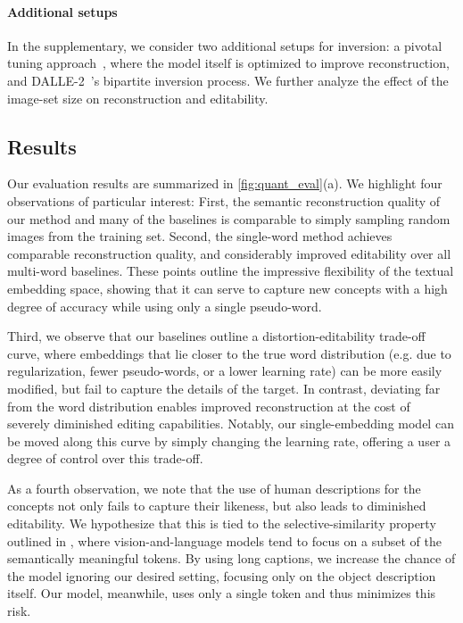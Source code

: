 \paragraph{Additional setups} In the supplementary, we consider two additional setups for inversion: a pivotal tuning approach~\citep{roich2021pivotal,bau2020semantic}, where the model itself is optimized to improve reconstruction, and DALLE-2~\citep{ramesh2022hierarchical}'s bipartite inversion process. We further analyze the effect of the image-set size on reconstruction and editability.

\subsection{Results}

Our evaluation results are summarized in \ref{fig:quant_eval}(a). 
We highlight four observations of particular interest: First, the semantic reconstruction quality of our method and many of the baselines is comparable to simply sampling random images from the training set. Second, the single-word method achieves comparable reconstruction quality, and considerably improved editability over all multi-word baselines. These points outline the impressive flexibility of the textual embedding space, showing that it can serve to capture new concepts with a high degree of accuracy while using only a single pseudo-word.

Third, we observe that our baselines outline a distortion-editability trade-off curve, where embeddings that lie closer to the true word distribution (e.g. due to regularization, fewer pseudo-words, or a lower learning rate) can be more easily modified, but fail to capture the details of the target. In contrast, deviating far from the word distribution enables improved reconstruction at the cost of severely diminished editing capabilities. Notably, our single-embedding model can be moved along this curve by simply changing the learning rate, offering a user a degree of control over this trade-off. 

As a fourth observation, we note that the use of human descriptions for the concepts not only fails to capture their likeness, but also leads to diminished editability. We hypothesize that this is tied to the selective-similarity property outlined in \citet{paiss2022no}, where vision-and-language models tend to focus on a subset of the semantically meaningful tokens. By using long captions, we increase the chance of the model ignoring our desired setting, focusing only on the object description itself. Our model, meanwhile, uses only a single token and thus minimizes this risk.

